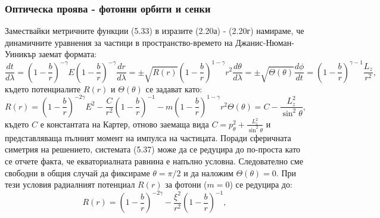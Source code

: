 \subsubsection{Оптическа проява - фотонни орбити и сенки}
Замествайки метричните функции (5.33) в изразите (2.20а) - (2.20г) намираме, че динамичните уравнения за частици в пространство-времето на Джанис-Нюман-Уиникър заемат формата:
\begin{subequations}
	\begin{equation}
		\frac{dt}{d\lambda} = \left(1 - \frac{b}{r}\right)^{-\gamma}E
	\end{equation}
	\begin{equation}
		\left(1 - \frac{b}{r}\right)^{-\gamma}\frac{dr}{d\lambda} = \pm\sqrt{R(r)}
	\end{equation}
	\begin{equation}
		\left(1 - \frac{b}{r}\right)^{1 - \gamma}r^2\frac{d\theta}{d\lambda} = \pm \sqrt{\Theta(\theta)}
	\end{equation}
	\begin{equation}
		\frac{d\phi}{dt} = \left(1 - \frac{b}{r}\right)^{\gamma-1}\frac{L_z}{r^2},
	\end{equation}
\end{subequations}
където потенциалите $R(r)$ и $\Theta(\theta)$ се задават като:
\begin{subequations}
	\begin{equation}
		R(r) = \left(1 - \frac{b}{r}\right)^{-2\gamma}E^2 - \frac{C}{r^2}\left(1 - \frac{b}{r}\right)^{-1} - m\left(1 - \frac{b}{r}\right)^{1 - \gamma}r^2
	\end{equation}
	\begin{equation}
		\Theta(\theta) = C - \frac{L_z^2}{\sin^2\theta},
	\end{equation}
\end{subequations}
където $C$ е константата на Картер, отново заемаща вида $C = p_\theta^2 + \frac{L_z^2}{\sin^2\theta}$ и представляваща пълният момент на импулса на частицата. Поради сферичната симетрия на решението, системата (5.37) може да се редуцира до по-проста като се отчете факта, че екваториалната равнина е напълно условна. Следователно сме свободни в общия случай да фиксираме $\theta = \pi / 2$ и да наложим $\Theta(\theta) = 0$. При тези условия радиалният потенциал $R(r)$ за фотони ($m = 0$) се редуцира до:
\begin{equation}
	R(r) = \left(1 - \frac{b}{r}\right)^{-2\gamma} - \frac{\xi^2}{r^2}\left(1 - \frac{b}{r}\right)^{-1} ,
\end{equation}
